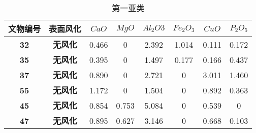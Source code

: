 \documentclass[withoutpreface,bwprint]{cumcmthesis} %
\begin{document}
 
\begin{table}[H]
	\caption{第一亚类}\label{tab:001} \centering
	\centering
	\setlength{\tabcolsep}{3mm}%
	\begin{tabular}{cc|cccccc}
		\toprule[1.5pt]
		\textbf{文物编号}&\textbf{表面风化}& \textbf{$CaO$} &\textbf{$MgO$}&\textbf{$Al_2O3$}&\textbf{$Fe_2O_3$} & \textbf{$CuO$}& \textbf{$P_2O_5$} \\  %
		\midrule[1pt]
		\textbf{32} & \textbf{无风化} & 0.466 &	0&	2.392&1.014&	0.111&	0.172 \\
		
		\textbf{35} & \textbf{无风化} &0.395&	0&	1.497&	0.177&	0.166&	0.437\\
		
		\textbf{37} & \textbf{无风化} &0.890&	0&	2.721&	0&	3.011&	1.460 \\
		
		\textbf{55} & \textbf{无风化} &1.172&	0&	1.504&	0	&0.892 &	0.363 \\
		
		\textbf{45} & \textbf{无风化} &0.854&	0.753	&5.084 &	0&	0.539&	0\\
		
		\textbf{47} & \textbf{无风化} &0.895&	0.627 &	3.146 &	0&	0.668 &	0.103\\
		\bottomrule[1.5pt]
	\end{tabular}
\end{table}
 
\end{document}
